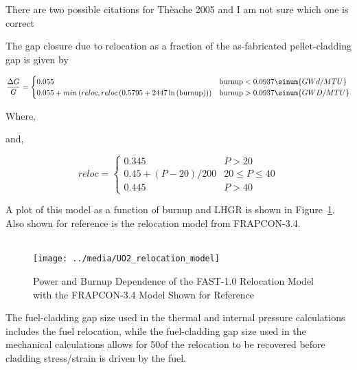 {\color{red}There are two possible citations for Th\`{e}ache 2005 and I am not sure which one is
correct}

The gap closure due to relocation as a fraction of the as-fabricated pellet-cladding gap is given by

\begin{equation}
    \label{eq:gap_closure_function_of_asfab_gap}
    \frac{\Delta G}{G} = 
    \begin{cases}
        0.055 & \text{burnup} < 0.0937 \sinum{GWd/MTU}  \\
        0.055 + min\left(reloc, reloc  \left(0.5795 + 2447  \ln\left(\text{burnup}\right)\right)\right)  & \text{burnup} > 0.0937 \sinum{GWD/MTU}
    \end{cases}
\end{equation}

Where,

and,

\begin{equation}
    \label{eq:relocation_as_function_of_power}
    reloc = 
    \begin{cases}
        0.345                      &   P > 20           \\
        0.45+\left(P-20\right)/200 & 20 \leq P \leq 40  \\
        0.445                      & P > 40
    \end{cases}
\end{equation}

A plot of this model as a function of burnup and LHGR is shown in 
Figure~\ref{fig:relocation_model}. Also shown for reference is the relocation model from FRAPCON-3.4.
\\
\\
\begin{figure}
    \texttt{[image: ../media/UO2\_relocation\_model]}
    \caption{Power and Burnup Dependence of the FAST-1.0 Relocation Model with the FRAPCON-3.4 Model Shown for Reference}
    \label{fig:relocation_model}
\end{figure}

The fuel-cladding gap size used in the thermal and internal pressure calculations includes the fuel
relocation, while the fuel-cladding gap size used in the mechanical calculations allows for
50\percent of the relocation to be recovered before cladding stress/strain is driven by the fuel.
